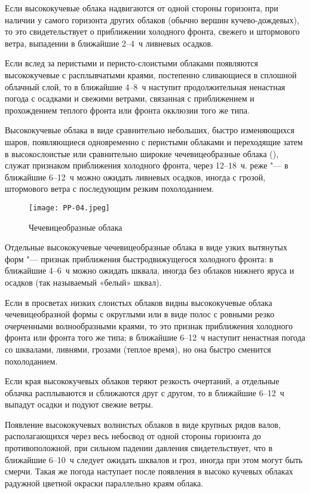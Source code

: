  Если высококучевые облака надвигаются от одной стороны
горизонта, при наличии у самого горизонта других облаков (обычно
вершин кучево-дождевых), то это свидетельствует о приближении
холодного фронта, свежего и штормового ветра, выпадении в ближайшие
2--4~ч ливневых осадков.

 Если вслед за перистыми и перисто-слоистыми облаками появляются
высококучевые с расплывчатыми краями, постепенно сливающиеся в
сплошной облачный слой, то в ближайшие 4--8~ч наступит
продолжительная ненастная погода с осадками и свежими ветрами,
связанная с приближением и прохождением теплого фронта или фронта
окклюзии того же типа.

 Высококучевые облака в виде сравнительно небольших, быстро
изменяющихся шаров, появляющиеся одновременно с перистыми облаками и
переходящие затем в высокослоистые или сравнительно широкие
чечевицеобразные облака (), служат признаком приближения
холодного фронта, через 12--18~ч. реже "--- в ближайшие 6--12~ч
можно ожидать ливневых осадков, иногда с грозой, штормового ветра с
последующим резким похолоданием.

\begin{figure}[htb]
  \centering{}
  \texttt{[image: PP-04.jpeg]}
  \caption{Чечевицеобразные облака}
  \label{fig:pp04}
  \small
  \centering{}
\end{figure}

 Отдельные высококучевые чечевицеобразные облака в виде узких
вытянутых форм "--- признак приближения быстродвижущегося холодного
фронта: в ближайшие 4--6~ч можно ожидать шквала, иногда без
облаков нижнего яруса и осадков (так называемый «белый» шквал).

 Если в просветах низких слоистых облаков видны высококучевые
облака чечевицеобразной формы с округлыми или в виде полос с ровными
резко очерченными волнообразными краями, то это признак приближения
холодного фронта или фронта того же типа; в ближайшие 6--12~ч наступит
ненастная погода со шквалами, ливнями, грозами (теплое время), но она
быстро сменится похолоданием.

 Если края высококучевых облаков теряют резкость очертаний, а
отдельные облачка расплываются и сближаются друг с другом, то в
ближайшие 6--12~ч выпадут осадки и подуют свежие ветры.

 Появление высококучевых волнистых облаков в виде крупных рядов
валов, располагающихся через весь небосвод от одной стороны горизонта
до противоположной, при сильном падении давления свидетельствует, что
в ближайшие 6--10~ч следует ожидать шквалов и гроз, иногда при этом
могут быть смерчи. Такая же погода наступает после появления в высоко
кучевых облаках радужной цветной окраски параллельно краям облака.

